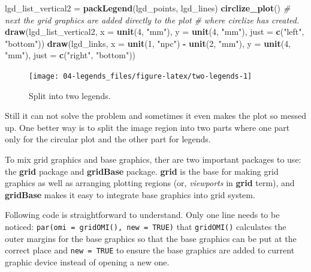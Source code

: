 \documentclass[]{book}
\newenvironment{Shaded}{\begin{snugshade}}{\end{snugshade}}
\newcommand{\KeywordTok}[1]{\textcolor[rgb]{0.13,0.29,0.53}{\textbf{#1}}}
\newcommand{\DataTypeTok}[1]{\textcolor[rgb]{0.13,0.29,0.53}{#1}}
\newcommand{\DecValTok}[1]{\textcolor[rgb]{0.00,0.00,0.81}{#1}}
\newcommand{\StringTok}[1]{\textcolor[rgb]{0.31,0.60,0.02}{#1}}
\newcommand{\CommentTok}[1]{\textcolor[rgb]{0.56,0.35,0.01}{\textit{#1}}}
\newcommand{\OperatorTok}[1]{\textcolor[rgb]{0.81,0.36,0.00}{\textbf{#1}}}
\newcommand{\NormalTok}[1]{#1}
\begin{document}
\begin{Shaded}
\begin{Highlighting}[]
\NormalTok{lgd_list_vertical2 =}\StringTok{ }\KeywordTok{packLegend}\NormalTok{(lgd_points, lgd_lines)}
\KeywordTok{circlize_plot}\NormalTok{()}
\CommentTok{# next the grid graphics are added directly to the plot}
\CommentTok{# where circlize has created.}
\KeywordTok{draw}\NormalTok{(lgd_list_vertical2, }\DataTypeTok{x =} \KeywordTok{unit}\NormalTok{(}\DecValTok{4}\NormalTok{, }\StringTok{"mm"}\NormalTok{), }\DataTypeTok{y =} \KeywordTok{unit}\NormalTok{(}\DecValTok{4}\NormalTok{, }\StringTok{"mm"}\NormalTok{), }\DataTypeTok{just =} \KeywordTok{c}\NormalTok{(}\StringTok{"left"}\NormalTok{, }\StringTok{"bottom"}\NormalTok{))}
\KeywordTok{draw}\NormalTok{(lgd_links, }\DataTypeTok{x =} \KeywordTok{unit}\NormalTok{(}\DecValTok{1}\NormalTok{, }\StringTok{"npc"}\NormalTok{) }\OperatorTok{-}\StringTok{ }\KeywordTok{unit}\NormalTok{(}\DecValTok{2}\NormalTok{, }\StringTok{"mm"}\NormalTok{), }\DataTypeTok{y =} \KeywordTok{unit}\NormalTok{(}\DecValTok{4}\NormalTok{, }\StringTok{"mm"}\NormalTok{), }
    \DataTypeTok{just =} \KeywordTok{c}\NormalTok{(}\StringTok{"right"}\NormalTok{, }\StringTok{"bottom"}\NormalTok{))}
\end{Highlighting}
\end{Shaded}

\begin{figure}

{\centering \texttt{[image: 04-legends\_files/figure-latex/two-legends-1]} 

}

\caption{Split into two legends.}\label{fig:two-legends}
\end{figure}

Still it can not solve the problem and sometimes it even makes the plot
so messed up. One better way is to split the image region into two parts
where one part only for the circular plot and the other part for
legends.

To mix grid graphics and base graphics, ther are two important packages
to use: the \textbf{grid} package and \textbf{gridBase} package.
\textbf{grid} is the base for making grid graphics as well as arranging
plotting regions (or, \emph{viewports} in \textbf{grid} term), and
\textbf{gridBase} makes it easy to integrate base graphics into grid
system.

Following code is straightforward to understand. Only one line needs to
be noticed: \texttt{par(omi\ =\ gridOMI(),\ new\ =\ TRUE)} that
\texttt{gridOMI()} calculates the outer margins for the base graphics so
that the base graphics can be put at the correct place and
\texttt{new\ =\ TRUE} to ensure the base graphics are added to current
graphic device instead of opening a new one.
\end{document}
